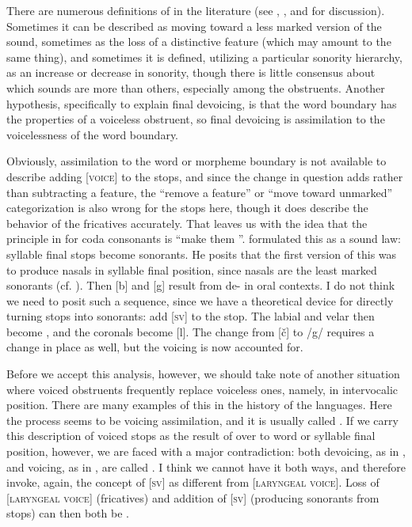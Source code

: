 \documentclass[output=paper]{LSP/langsci}
\begin{document}
There are numerous definitions of  in the literature (see \citealt{Honeybone2008}, \citealt{Harris2009}, and \citealt{Szigetvari2008} for discussion). Sometimes it can be described as moving toward a less marked version of the sound, sometimes as the loss of a distinctive feature (which may amount to the same thing), and sometimes it is defined, utilizing a particular sonority hierarchy, as an increase or decrease in sonority, though there is little consensus about which sounds are more  than others, especially among the obstruents. Another hypothesis, specifically to explain final devoicing, is that the word boundary has the properties of a voiceless obstruent, so final devoicing is assimilation to the voicelessness of the word boundary.

Obviously, assimilation to the word or morpheme boundary is not available to describe adding [\textsc{voice}] to the  stops, and since the change in question adds rather than subtracting a feature, the ``remove a feature'' or ``move toward unmarked'' categorization is also wrong for the stops here, though it does describe the behavior of the fricatives accurately. That leaves us with the idea that the principle in  for coda consonants is ``make them ''. \citet[5]{Rankin2001} formulated this as a sound law: syllable final stops become sonorants. He posits that the first version of this  was to produce nasals in syllable final position, since nasals are the least marked sonorants (cf. \citealt{Rice1993}). Then [b] and [g] result from de- in oral contexts. I do not think we need to posit such a sequence, since we have a theoretical device for directly turning stops into sonorants: add [\textsc{sv}] to the stop. The labial and velar then become , and the coronals become [l]. The change from [\v{c}] to /g/ requires a change in place as well, but the voicing is now accounted for.

Before we accept this analysis, however, we should take note of another situation where voiced obstruents frequently replace voiceless ones, namely, in intervocalic position. There are many examples of this in the history of the  languages. Here the process seems to be voicing assimilation, and it is usually called . If we carry this description of voiced stops as the result of  over to word or syllable final position, however, we are faced with a major contradiction: both devoicing, as in , and voicing, as in , are called . I think we cannot have it both ways, and therefore invoke, again, the concept of [\textsc{sv}] as different from [\textsc{laryngeal voice}]. Loss of [\textsc{laryngeal voice}] (fricatives) and addition of [\textsc{sv}] (producing sonorants from stops) can then both be .
\end{document}
